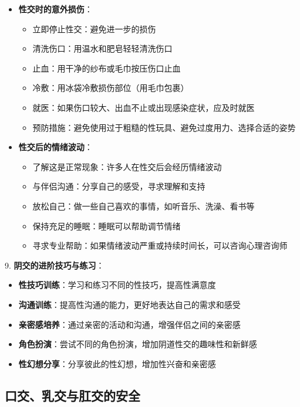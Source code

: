 \documentclass[12pt,UTF8]{ctexbook}
\begin{document}
\begin{itemize}
\begin{itemize}
		\item 避免过度用力或粗暴的动作
		\item 咨询医生：了解是否有子宫内膜异位症、盆腔炎、阴道炎、外阴炎等问题
		\item 考虑盆底肌肉治疗：如盆底康复训练
	\end{itemize}
	\item \textbf{性交时的意外损伤}：
	\begin{itemize}
		\item 立即停止性交：避免进一步的损伤
		\item 清洗伤口：用温水和肥皂轻轻清洗伤口
		\item 止血：用干净的纱布或毛巾按压伤口止血
		\item 冷敷：用冰袋冷敷损伤部位（用毛巾包裹）
		\item 就医：如果伤口较大、出血不止或出现感染症状，应及时就医
		\item 预防措施：避免使用过于粗糙的性玩具、避免过度用力、选择合适的姿势
	\end{itemize}
	\item \textbf{性交后的情绪波动}：
	\begin{itemize}
		\item 了解这是正常现象：许多人在性交后会经历情绪波动
		\item 与伴侣沟通：分享自己的感受，寻求理解和支持
		\item 放松自己：做一些自己喜欢的事情，如听音乐、洗澡、看书等
		\item 保持充足的睡眠：睡眠可以帮助调节情绪
		\item 寻求专业帮助：如果情绪波动严重或持续时间长，可以咨询心理咨询师
	\end{itemize}
\end{itemize}

9. \textbf{阴交的进阶技巧与练习}：
\begin{itemize}
	\item \textbf{性技巧训练}：学习和练习不同的性技巧，提高性满意度
	\item \textbf{沟通训练}：提高性沟通的能力，更好地表达自己的需求和感受
	\item \textbf{亲密感培养}：通过亲密的活动和沟通，增强伴侣之间的亲密感
	\item \textbf{角色扮演}：尝试不同的角色扮演，增加阴道性交的趣味性和新鲜感
	\item \textbf{性幻想分享}：分享彼此的性幻想，增加性兴奋和亲密感
\end{itemize}
\subsection{口交、乳交与肛交的安全}
\end{document}
